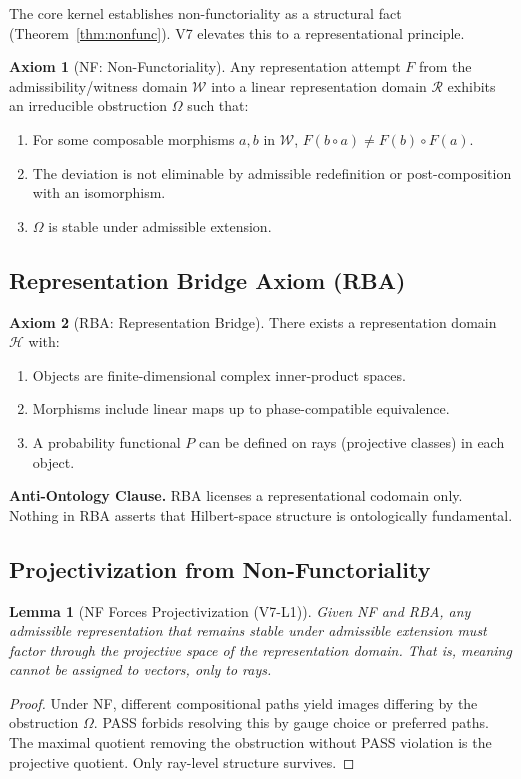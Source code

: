 \documentclass[11pt,a4paper]{article}
\newtheorem{lemma}[theorem]{Lemma}
\theoremstyle{definition}
\newtheorem{axiom}{Axiom}
\theoremstyle{remark}
\begin{document}
The core kernel establishes non-functoriality as a structural fact (Theorem~\ref{thm:nonfunc}). V7 elevates this to a representational principle.

\begin{axiom}[NF: Non-Functoriality]\label{ax:nf}
Any representation attempt $F$ from the admissibility/witness domain $\mathcal{W}$ into a linear representation domain $\mathcal{R}$ exhibits an irreducible obstruction $\Omega$ such that:
\begin{enumerate}[label=(\roman*)]
  \item For some composable morphisms $a, b$ in $\mathcal{W}$, $F(b \circ a) \neq F(b) \circ F(a)$.
  \item The deviation is not eliminable by admissible redefinition or post-composition with an isomorphism.
  \item $\Omega$ is stable under admissible extension.
\end{enumerate}
\end{axiom}

\subsection{Representation Bridge Axiom (RBA)}

\begin{axiom}[RBA: Representation Bridge]\label{ax:rba}
There exists a representation domain $\mathcal{H}$ with:
\begin{enumerate}[label=(\roman*)]
  \item Objects are finite-dimensional complex inner-product spaces.
  \item Morphisms include linear maps up to phase-compatible equivalence.
  \item A probability functional $P$ can be defined on rays (projective classes) in each object.
\end{enumerate}
\end{axiom}

\noindent\textbf{Anti-Ontology Clause.} RBA licenses a representational codomain only. Nothing in RBA asserts that Hilbert-space structure is ontologically fundamental.

\subsection{Projectivization from Non-Functoriality}

\begin{lemma}[NF Forces Projectivization (V7-L1)]\label{lem:project}
Given NF and RBA, any admissible representation that remains stable under admissible extension must factor through the projective space of the representation domain. That is, meaning cannot be assigned to vectors, only to rays.
\end{lemma}
\begin{proof}
Under NF, different compositional paths yield images differing by the obstruction $\Omega$. PASS forbids resolving this by gauge choice or preferred paths. The maximal quotient removing the obstruction without PASS violation is the projective quotient. Only ray-level structure survives.
\end{proof}
\end{document}
